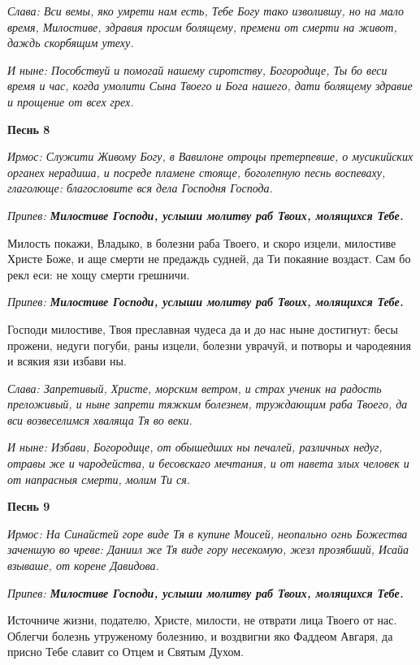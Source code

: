 \itshape Слава: \normalfont{}Вси вемы, яко умрети нам есть, Тебе Богу тако изволившу, но на мало время, Милостиве, здравия просим болящему, премени от смерти на живот, даждь скорбящим утеху.

\itshape И ныне: \normalfont{}Пособствуй и помогай нашему сиротству, Богородице, Ты бо веси время и час, когда умолити Сына Твоего и Бога нашего, дати болящему здравие и прощение от всех грех.


\medskip


\bfseries Песнь 8\normalfont{}


\itshape Ирмос: \normalfont{}Служити Живому Богу, в Вавилоне отроцы претерпевше, о мусикийских органех нерадиша, и посреде пламене стояще, боголепную песнь воспеваху, глаголюще: благословите вся дела Господня Господа.

\itshape Припев: \normalfont{}\bfseries Милостиве Господи, услыши молитву раб Твоих, молящихся Тебе.

\normalfont{}Милость покажи, Владыко, в болезни раба Твоего, и скоро изцели, милостиве Христе Боже, и аще смерти не предаждь судней, да Ти покаяние воздаст. Сам бо рекл еси: не хощу смерти грешничи.

\itshape Припев: \normalfont{}\bfseries Милостиве Господи, услыши молитву раб Твоих, молящихся Тебе.

\normalfont{}Господи милостиве, Твоя преславная чудеса да и до нас ныне достигнут: бесы прожени, недуги погуби, раны изцели, болезни уврачуй, и потворы и чародеяния и всякия язи избави ны.

\itshape Слава: \normalfont{}Запретивый, Христе, морским ветром, и страх ученик на радость преложивый, и ныне запрети тяжким болезнем, труждающим раба Твоего, да вси возвеселимся хваляща Тя во веки.

\itshape И ныне: \normalfont{}Избави, Богородице, от обышедших ны печалей, различных недуг, отравы же и чародейства, и бесовскаго мечтания, и от навета злых человек и от напрасныя смерти, молим Ти ся.


\medskip


\bfseries Песнь 9\normalfont{}


\itshape Ирмос: \normalfont{}На Синайстей горе виде Тя в купине Моисей, неопально огнь Божества заченшую во чреве: Даниил же Тя виде гору несекомую, жезл прозябший, Исайа взываше, от корене Давидова.

\itshape Припев: \normalfont{}\bfseries Милостиве Господи, услыши молитву раб Твоих, молящихся Тебе.

\normalfont{}Источниче жизни, подателю, Христе, милости, не отврати лица Твоего от нас. Облегчи болезнь утруженому болезнию, и воздвигни яко Фаддеом Авгаря, да присно Тебе славит со Отцем и Святым Духом.

